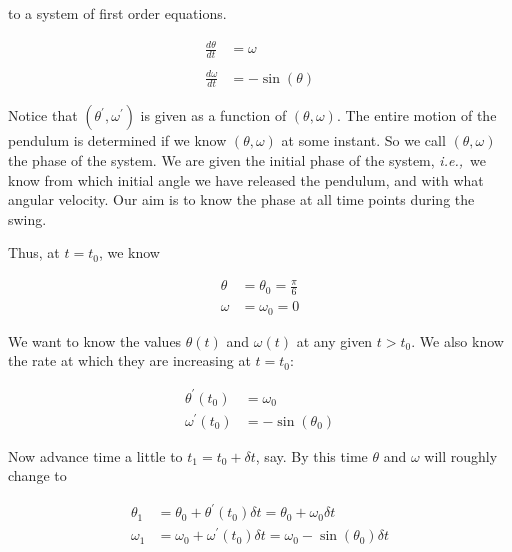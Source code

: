 \documentclass[a4paper,11pt]{report}
\begin{document}
\begin{enumerate}
    to a system of first order equations.

    \begin{equation*}
    \begin{aligned}
    \frac{d \theta}{dt} &= \omega \\ \\
    \frac{d \omega}{dt} &= -\sin(\theta)
    \end{aligned}
    \end{equation*}

    Notice that $(\theta^\prime, \omega^\prime)$ is given as a function of $(\theta,
    \omega)$. The entire motion of the pendulum is determined if we know $(\theta,
    \omega)$ at some instant. So we call $(\theta, \omega)$ the phase of the system. We
    are given the initial phase of the system, \textit{i.e.,}\ we know from which initial
    angle we have released the pendulum, and with what angular velocity. Our aim is to 
    know the phase at all time points during the swing.

    Thus, at $t = t_0$, we know
    
    \begin{equation*}
    \begin{aligned}
    \theta &= \theta_0 = \frac{\pi}{6} \\
    \omega &= \omega_0 = 0
    \end{aligned}
    \end{equation*}

    We want to know the values $\theta(t)$ and $\omega(t)$ at any given $t > t_0$. We 
    also know the rate at which they are increasing at $t = t_0$:

    \begin{equation*}
    \begin{aligned}
    \theta^{\prime}(t_0) &= \omega_0 \\
    \omega^{\prime}(t_0) &= - \sin(\theta_0)
    \end{aligned}
    \end{equation*}

    Now advance time a little to $t_1 = t_0 + \delta t$, say. By this time $\theta$ and
    $\omega$ will roughly change to

    \begin{equation*}
    \begin{aligned}
    \theta_1 &= \theta_0 + \theta^{\prime}(t_0) \delta t = \theta_0 + \omega_0 \delta t \\
    \omega_1 &= \omega_0 + \omega^{\prime}(t_0) \delta t = \omega_0 - \sin(\theta_0) \delta t
    \end{aligned}
    \end{equation*}


\end{enumerate}
\end{document}
